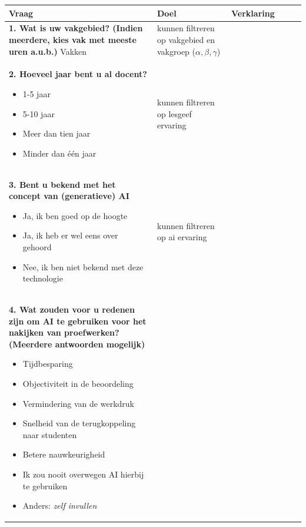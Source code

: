 \documentclass[12pt]{article}
\begin{document}
\begin{longtable}{p{0.5\linewidth}|p{0.25\linewidth}|p{0.25\linewidth}}
    Vraag & Doel & Verklaring \\
    \endhead
    \hline 
    \begin{minipage}[t]{\linewidth}
        \textbf{1. Wat is uw vakgebied? (Indien meerdere, kies vak met meeste uren a.u.b.) }
        \hspace{4em} Vakken        
    \end{minipage} & kunnen filtreren op vakgebied en vakgroep ($\alpha, \beta, \gamma$) & \\
    \hline 
    \begin{minipage}[t]{\linewidth}
        \textbf{2. Hoeveel jaar bent u al docent? }
        \begin{itemize}
            \item 1-5 jaar
            \item 5-10 jaar
            \item Meer dan tien jaar
            \item Minder dan één jaar
        \end{itemize}
    \end{minipage} & kunnen filtreren op lesgeef ervaring & \\
    \hline 
    \begin{minipage}[t]{\linewidth}
        \textbf{3. Bent u bekend met het concept van (generatieve) AI\? }
        \begin{itemize}
            \item Ja, ik ben goed op de hoogte
            \item Ja, ik heb er wel eens over gehoord
            \item Nee, ik ben niet bekend met deze technologie
        \end{itemize}
    \end{minipage} & kunnen filtreren op ai ervaring & \\
    \hline 
    \begin{minipage}[t]{\linewidth}
        \textbf{4. Wat zouden voor u redenen zijn om AI te gebruiken voor het nakijken van proefwerken? (Meerdere antwoorden mogelijk) }
        \begin{itemize}
            \item Tijdbesparing
            \item Objectiviteit in de beoordeling
            \item Vermindering van de werkdruk
            \item Snelheid van de terugkoppeling naar studenten
            \item Betere nauwkeurigheid
            \item Ik zou nooit overwegen AI hierbij te gebruiken
            \item Anders: \textit{zelf invullen}


\end{itemize}
\end{minipage}
\end{longtable}
\end{document}
